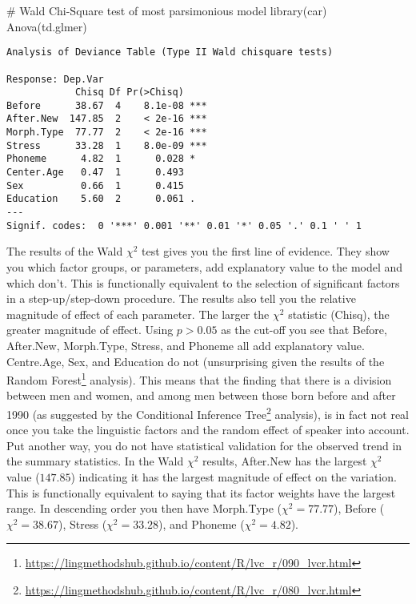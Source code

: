 \documentclass[
  10pt,
  letterpaper]{article}
\newenvironment{Shaded}{\begin{snugshade}}{\end{snugshade}}
\newcommand{\CommentTok}[1]{\textcolor[rgb]{0.37,0.37,0.37}{#1}}
\newcommand{\FunctionTok}[1]{\textcolor[rgb]{0.28,0.35,0.67}{#1}}
\newcommand{\NormalTok}[1]{\textcolor[rgb]{0.00,0.23,0.31}{#1}}
\renewcommand\texttt[1]{{\ttfamily\color{BrickRed}#1}}
\DeclareRobustCommand{\href}[2]{#2\footnote{\url{#1}}}
\begin{document}
\begin{Shaded}
\begin{Highlighting}[]
\CommentTok{\# Wald Chi{-}Square test of most parsimonious model}
\FunctionTok{library}\NormalTok{(car)}
\FunctionTok{Anova}\NormalTok{(td.glmer)}
\end{Highlighting}
\end{Shaded}

\begin{verbatim}
Analysis of Deviance Table (Type II Wald chisquare tests)

Response: Dep.Var
            Chisq Df Pr(>Chisq)    
Before      38.67  4    8.1e-08 ***
After.New  147.85  2    < 2e-16 ***
Morph.Type  77.77  2    < 2e-16 ***
Stress      33.28  1    8.0e-09 ***
Phoneme      4.82  1      0.028 *  
Center.Age   0.47  1      0.493    
Sex          0.66  1      0.415    
Education    5.60  2      0.061 .  
---
Signif. codes:  0 '***' 0.001 '**' 0.01 '*' 0.05 '.' 0.1 ' ' 1
\end{verbatim}

The results of the Wald \(\chi^2\) test gives you the first line of
evidence. They show you which factor groups, or parameters, add
explanatory value to the model and which don't. This is functionally
equivalent to the selection of significant factors in a
step-up/step-down procedure. The results also tell you the relative
magnitude of effect of each parameter. The larger the \(\chi^2\)
statistic (\texttt{Chisq}), the greater magnitude of effect. Using
\(p>0.05\) as the cut-off you see that \texttt{Before},
\texttt{After.New}, \texttt{Morph.Type}, \texttt{Stress}, and
\texttt{Phoneme} all add explanatory value. \texttt{Centre.Age},
\texttt{Sex}, and \texttt{Education} do not (unsurprising given the
results of the
\href{https://lingmethodshub.github.io/content/R/lvc_r/090_lvcr.html}{Random
Forest} analysis). This means that the finding that there is a division
between men and women, and among men between those born before and after
1990 (as suggested by the
\href{https://lingmethodshub.github.io/content/R/lvc_r/080_lvcr.html}{Conditional
Inference Tree} analysis), is in fact not real once you take the
linguistic factors and the random effect of speaker into account. Put
another way, you do not have statistical validation for the observed
trend in the summary statistics. In the Wald \(\chi^2\) results,
\texttt{After.New} has the largest \(\chi^2\) value (\(147.85\))
indicating it has the largest magnitude of effect on the variation. This
is functionally equivalent to saying that its factor weights have the
largest range. In descending order you then have \texttt{Morph.Type}
(\(\chi^2 = 77.77\)), \texttt{Before} (\(\chi^2 = 38.67\)),
\texttt{Stress} (\(\chi^2 = 33.28\)), and \texttt{Phoneme}
(\(\chi^2 = 4.82\)).
\end{document}

